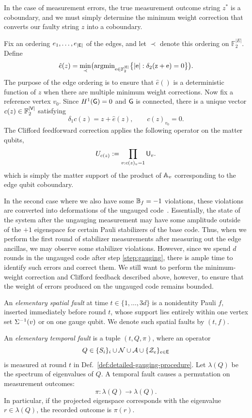 \documentclass[11pt]{article}
\begin{document}
In the case of measurement errors, the true measurement outcome string $z^*$ is a coboundary, and we must simply determine the minimum weight correction that converts our faulty string $z$ into a coboundary.

Fix an ordering $e_1,\dots,e_{|\mathsf{E}|}$ of the edges, and let $\prec$ denote this ordering on $\mathbb{F}_2^{|E|}$. 
Define
    \[
    \hat{e}(z) = \min_{\prec}\bigl(\rm{argmin}_{e\in \mathbb{F}_2^{|\mathsf{E}|}}\bigl\{|e|:\delta_2(z+e)=0\bigr\}\bigr).
    \]
The purpose of the edge ordering is to ensure that $\hat{e}()$ is a deterministic function of $z$ when there are multiple minimum weight corrections.
Now fix a reference vertex $v_0$. Since $H^1(\mathsf{G})=0$ and $\mathsf{G}$ is connected, there is a unique vector $c(z) \in \mathbb{F}_2^{|\mathsf{V}|}$ satisfying
\[
    \delta_1 c(z)  = z+ \hat{e}(z),\qquad c(z)_{v_0} = 0.
\]
The Clifford feedforward correction applies the following operator on the matter qubits,
\begin{equation}
\label{eq:feedforward-clifford}
    U_{c(z)} :=\prod_{v:c(z)_v=1}\mathsf{U}_v.
\end{equation} which is simply the matter support of the product of $\mathbb{A}_v$ corresponding to the edge qubit coboundary.

In the second case where we also have some $\mathbb{B}_f = -1$ violations, these violations are converted into deformations of the ungauged code~\cite{lyons2026}. Essentially, the state of the system after the ungauging measurement may have some amplitude outside of the $+1$ eigenspace for certain Pauli stabilizers of the base code. Thus, when we perform the first round of stabilizer measurements after measuring out the edge ancillas, we may observe some stabilizer violations. However, since we spend $d$ rounds in the ungauged code after step \ref{step:gauging}, there is ample time to identify such errors and correct them. We still want to perform the minimum-weight correction and Clifford feedback described above, however, to ensure that the weight of errors produced on the ungauged code remains bounded. 


\begin{definition}
\label{def:elementary-faults}
An \emph{elementary spatial fault} at time $t\in \{1,\dots, 3d\}$ is a nonidentity Pauli $f$, inserted immediately before round $t$, whose support lies entirely within one vertex set $\Sigma^{-1}(v)$ or on one gauge qubit. We denote such spatial faults by $(t,f)$.

An \emph{elementary temporal fault} is a tuple $(t, Q, \pi)$, where an operator 
\[
Q\in \{S_i\}_i\cup \mathcal{N} \cup \mathcal{A} \cup \{\mathcal{Z}_e\}_{e\in \mathsf{E}}
\]
is measured at round $t$ in Def.~\ref{def:detailed-gauging-procedure}. Let $\lambda(Q)$ be the spectrum of eigenvalues of $Q$.
A temporal fault causes a permutation on measurement outcomes:
\[
\pi:\lambda(Q)\longrightarrow\lambda(Q).
\] 
In particular, if the projected eigenspace corresponds with the eigenvalue $r\in \lambda(Q)$, the recorded outcome is $\pi(r)$.
\end{definition}
\end{document}

